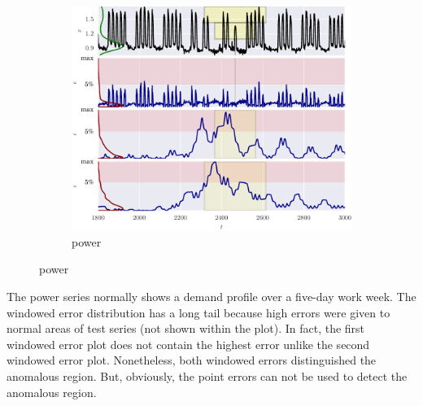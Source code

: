 \begin{figure}[!hp]
    \ContinuedFloat 

    \begin{subfigure}[t]{\textwidth} 
        \centering
        \includegraphics[]{figs/er_power.pdf}
        \caption{power}
    \end{subfigure}%

\end{figure}

The power series normally shows a demand profile over a five-day work week.
%
The windowed error distribution has a long tail because high errors were given to normal areas of test series (not shown within the plot).
%
In fact, the first windowed error plot does not contain the highest error unlike the second windowed error plot.
%
Nonetheless, both windowed errors distinguished the anomalous region.
%
But, obviously, the point errors can not be used to detect the anomalous region.




